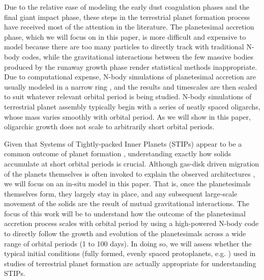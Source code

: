 \documentclass[twocolumn,linenumbers]{aastex63}
\begin{document}
Due to the relative ease of modeling the early dust coagulation phases
and the final giant impact phase, these steps in the terrestrial
planet formation process have received most of the attention in the
literature. The planetesimal accretion phase, which we will focus on
in this paper, is more difficult and expensive to model because there are too
many particles to directly track with traditional N-body codes, while
the gravitational interactions between the few massive bodies produced by the runaway growth phase \citep{ida93, kokubo95, kokubo98} render statistical methods inappropriate. Due to computational expense, N-body simulations of
planetesimal accretion are usually modeled in a narrow
ring \citep{kokubo96, kokubo98}, and the results and timescales are then scaled to suit whatever relevant orbital period is being 
studied. N-body simulations of terrestrial planet assembly typically begin with a series of neatly spaced oligarchs, whose mass 
varies smoothly with orbital period. As we will show in this paper, oligarchic growth does not scale to arbitrarily short
orbital periods.

Given that Systems of Tightly-packed Inner Planets (STIPs) appear to
be a common outcome of planet formation \citep{lantham11, lissauer11, rowe14}, understanding exactly how
solids accumulate at short orbital periods is crucial. Although
gas-disk driven migration of the planets themselves is often invoked
to explain the observed architectures \citep{izidoro17, izidoro21}, we will focus on an in-situ
model in this paper. That is, once the planetesimals themselves form,
they largely stay in place, and any subsequent large-scale movement of
the solids are the result of mutual gravitational interactions. The
focus of this work will be to understand how the outcome of the
planetesimal accretion process scales with orbital period by using a
high-powered N-body code to directly follow the growth and evolution
of the planetesimals across a wide range of orbital periods (1 to 100
days). In doing so, we will assess whether the typical initial conditions (fully formed, evenly spaced protoplanets, e.g. \citet{raymond06}) used in studies of terrestrial planet formation are actually appropriate for understanding STIPs.
\end{document}

